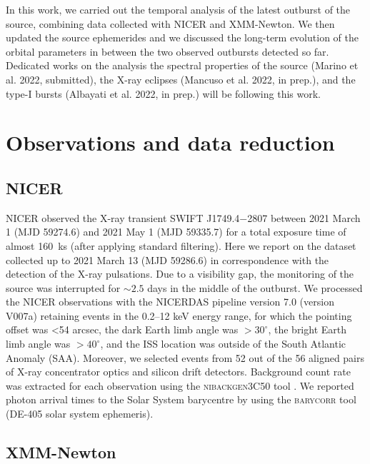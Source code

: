 \documentclass[fleqn,usenatbib]{mnras}
\newcommand{\swiftj}{SWIFT J1749.4$-$2807}
\newcommand{\nicer}{NICER}
\newcommand{\xmm}{XMM-Newton}
\begin{document}
In this work, we carried out the temporal analysis of the latest outburst of the source, combining data collected with \nicer{} and \xmm{}. We then updated the source ephemerides and we discussed the long-term evolution of the orbital parameters in between the two observed outbursts detected so far. Dedicated works on the analysis the spectral properties of the source (Marino et al. 2022, submitted), the X-ray eclipses (Mancuso et al. 2022, in prep.), and the type-I bursts (Albayati et al. 2022, in prep.) will be following this work.

\section{Observations and data reduction}


\subsection{NICER}

NICER \citep{Gendreau:2012vf} observed the X-ray transient \swiftj{} between 2021 March 1 (MJD 59274.6) and 2021 May 1 (MJD 59335.7) for a total exposure time of almost 160~ks (after applying standard filtering). Here we report on the dataset collected up to 2021 March 13 (MJD 59286.6) in correspondence with the detection of the X-ray pulsations. Due to a visibility gap, the monitoring of the source was interrupted for $\sim2.5$ days in the middle of the outburst. We processed the NICER observations with the \textsc{NICERDAS} pipeline version 7.0 (version V007a) retaining events in the 0.2--12 keV energy range, for which the pointing offset was <54 arcsec, the dark Earth limb angle was $>30^\circ$, the bright Earth limb angle was $>40^\circ$, and the ISS location was outside of the South Atlantic Anomaly (SAA). Moreover, we selected events from 52 out of the 56 aligned pairs of X-ray concentrator optics and silicon drift detectors. Background count rate was extracted for each observation using the \textsc{nibackgen3C50} tool \citep{Remillard:2021tt}. We reported photon arrival times to the Solar System barycentre by using the \textsc{barycorr} tool (DE-405 solar system ephemeris).   


\subsection{XMM-Newton}
\end{document}
